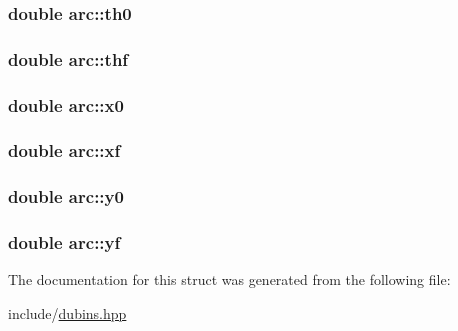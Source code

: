 \subsubsection[{\texorpdfstring{th0}{th0}}]{\setlength{\rightskip}{0pt plus 5cm}double arc\+::th0}\hypertarget{structarc_ab765aaeb5808e77eb46c5945d46721b2}{}\label{structarc_ab765aaeb5808e77eb46c5945d46721b2}
\subsubsection[{\texorpdfstring{thf}{thf}}]{\setlength{\rightskip}{0pt plus 5cm}double arc\+::thf}\hypertarget{structarc_a83c106a3b39bb17ca66e7d5cf5f5faf0}{}\label{structarc_a83c106a3b39bb17ca66e7d5cf5f5faf0}
\subsubsection[{\texorpdfstring{x0}{x0}}]{\setlength{\rightskip}{0pt plus 5cm}double arc\+::x0}\hypertarget{structarc_ad60b4e1112097080fa11407721c0861f}{}\label{structarc_ad60b4e1112097080fa11407721c0861f}
\subsubsection[{\texorpdfstring{xf}{xf}}]{\setlength{\rightskip}{0pt plus 5cm}double arc\+::xf}\hypertarget{structarc_a251bf33e415a35d8741614d269533438}{}\label{structarc_a251bf33e415a35d8741614d269533438}
\subsubsection[{\texorpdfstring{y0}{y0}}]{\setlength{\rightskip}{0pt plus 5cm}double arc\+::y0}\hypertarget{structarc_a08238ea80ade516e2ebfdb26a2606f5b}{}\label{structarc_a08238ea80ade516e2ebfdb26a2606f5b}
\subsubsection[{\texorpdfstring{yf}{yf}}]{\setlength{\rightskip}{0pt plus 5cm}double arc\+::yf}\hypertarget{structarc_aec9559e816f88bceac0fca3f2728d96f}{}\label{structarc_aec9559e816f88bceac0fca3f2728d96f}


The documentation for this struct was generated from the following file\+:\begin{DoxyCompactItemize}
\item 
include/\hyperlink{dubins_8hpp}{dubins.\+hpp}\end{DoxyCompactItemize}
